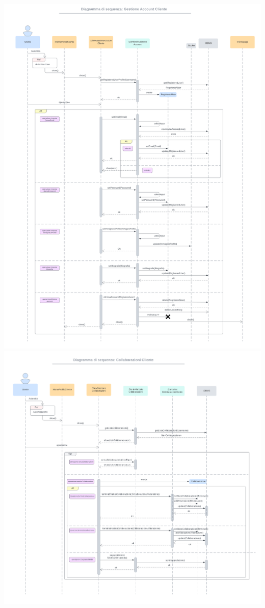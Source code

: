 \includegraphics[width=1\textwidth]{assets/img/sequenza_dettaglio/cliente-1.png}\\
\includegraphics[width=1\textwidth]{assets/img/sequenza_dettaglio/cliente-2.png}\\